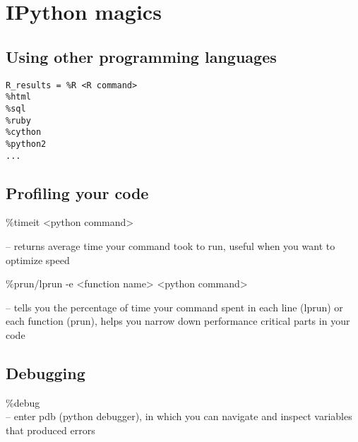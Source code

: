 \documentclass[12pt]{article}
\begin{document}
\section*{IPython magics}
\begin{minipage}[t]{0.60\textwidth}
\subsection*{Using other programming languages}
\begin{verbatim}
R_results = %R <R command>
%html
%sql
%ruby
%cython
%python2
...
\end{verbatim}
\subsection*{Profiling your code}

\%timeit <python command>

	\textsf{-- returns average time your command took to
	run, useful when you want to optimize speed}
\vspace{1cm}

\%prun/lprun -e <function name> <python command>

	\textsf{-- tells you the percentage of time your
	command spent in each line (lprun)
	or each function (prun), helps you
	narrow down performance critical
	parts in your code}



\end{minipage}
\begin{minipage}[t]{0.40\textwidth}
\subsection*{Debugging}

\%debug\\
	\textsf{-- enter pdb (python debugger), in which you
	 can navigate and inspect variables that
	 produced errors}

\end{minipage}
\end{document}

